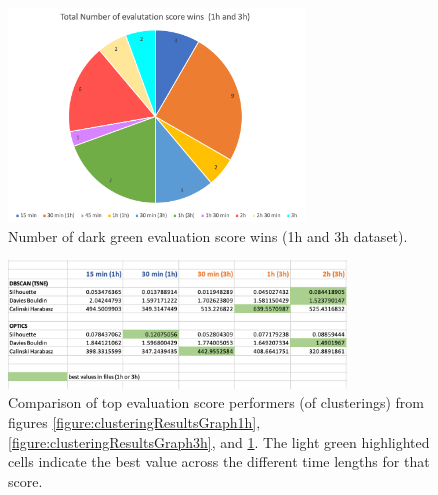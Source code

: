 \begin{figure}
  \centering
  \includegraphics[width=0.7\textwidth]{./images/clusteringResults/clusteringResultsGraphTotal.png}
  \caption{Number of dark green evaluation score wins (1h and 3h dataset).}
  \label{figure:clusteringResultsGraphTotal}
\end{figure}

\begin{figure}
  \centering
  \includegraphics[width=0.8\textwidth]{./images/clusteringResults/clusteringResults8.png}
  \caption{Comparison of top evaluation score performers (of clusterings) from figures \ref{figure:clusteringResultsGraph1h}, \ref{figure:clusteringResultsGraph3h}, and \ref{figure:clusteringResultsGraphTotal}. The light green highlighted cells indicate the best value across the different time lengths for that score.}
  \label{figure:clusteringResults8}
\end{figure}

\clearpage
